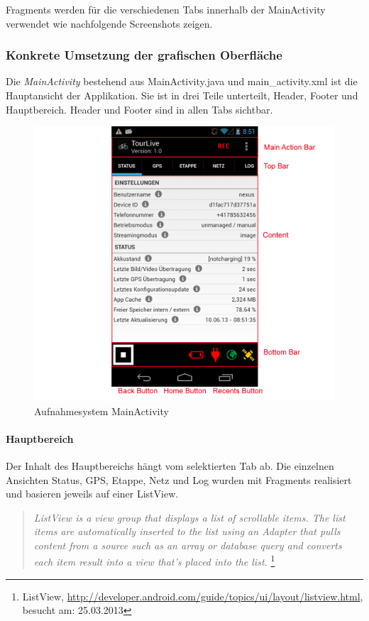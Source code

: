 Fragments werden für die verschiedenen Tabs innerhalb der MainActivity verwendet wie nachfolgende Screenshots zeigen.

\subsubsection{Konkrete Umsetzung der grafischen Oberfläche}
Die \textit{MainActivity} bestehend aus MainActivity.java und main\_activity.xml ist die Hauptansicht der Applikation. Sie ist in drei Teile unterteilt, Header, Footer und Hauptbereich. Header und Footer sind in allen Tabs sichtbar.

\begin{figure}[H]
	\centering
	\includegraphics[width=120mm]{images/android/status.png}
	\caption{Aufnahmesystem MainActivity}
\end{figure}

\paragraph{Hauptbereich}
Der Inhalt des Hauptbereichs hängt vom selektierten Tab ab. Die einzelnen Ansichten Status, GPS, Etappe, Netz und Log wurden mit Fragments realisiert und basieren jeweils auf einer ListView.

\begin{quotation}
\textit{ListView is a view group that displays a list of scrollable items. The list items are automatically inserted to the list using an Adapter that pulls content from a source such as an array or database query and converts each item result into a view that's placed into the list.} \footnote{ListView, \url{http://developer.android.com/guide/topics/ui/layout/listview.html}, besucht am: 25.03.2013}
\end{quotation}

